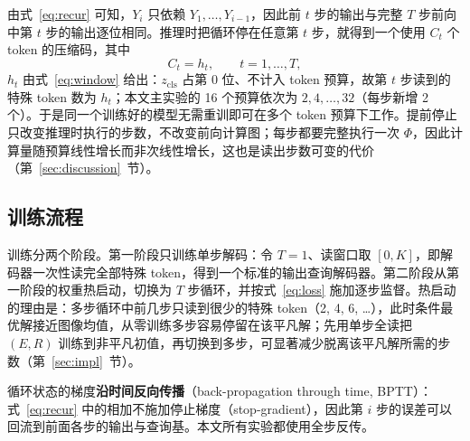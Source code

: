 由式~\eqref{eq:recur} 可知，$Y_i$ 只依赖 $Y_1,\dots,Y_{i-1}$，因此前 $t$ 步的输出与完整 $T$ 步前向中第 $t$ 步的输出逐位相同。推理时把循环停在任意第 $t$ 步，就得到一个使用 $C_t$ 个 token 的压缩码，其中
\begin{equation}
C_t=h_t,\qquad t=1,\dots,T,
\label{eq:budget}
\end{equation}
$h_t$ 由式~\eqref{eq:window} 给出：$z_{\mathrm{cls}}$ 占第 0 位、不计入 token 预算，故第 $t$ 步读到的特殊 token 数为 $h_t$；本文主实验的 16 个预算依次为 $2,4,\dots,32$（每步新增 2 个）。于是同一个训练好的模型无需重训即可在多个 token 预算下工作。提前停止只改变推理时执行的步数，不改变前向计算图；每步都要完整执行一次 $\Phi$，因此计算量随预算线性增长而非次线性增长，这也是读出步数可变的代价（第~\ref{sec:discussion}~节）。

\subsection{\heiti 训练流程}
\label{sec:training}

训练分两个阶段。第一阶段只训练单步解码：令 $T=1$、读窗口取 $[0,K]$，即解码器一次性读完全部特殊 token，得到一个标准的输出查询解码器。第二阶段从第一阶段的权重热启动，切换为 $T$ 步循环，并按式~\eqref{eq:loss} 施加逐步监督。热启动的理由是：多步循环中前几步只读到很少的特殊 token（2, 4, 6, \dots），此时条件最优解接近图像均值，从零训练多步容易停留在该平凡解；先用单步全读把 $(E,R)$ 训练到非平凡初值，再切换到多步，可显著减少脱离该平凡解所需的步数（第~\ref{sec:impl}~节）。

循环状态的梯度\textbf{沿时间反向传播}（back-propagation through time, BPTT）：式~\eqref{eq:recur} 中的相加不施加停止梯度（stop-gradient），因此第 $i$ 步的误差可以回流到前面各步的输出与查询基。本文所有实验都使用全步反传。
